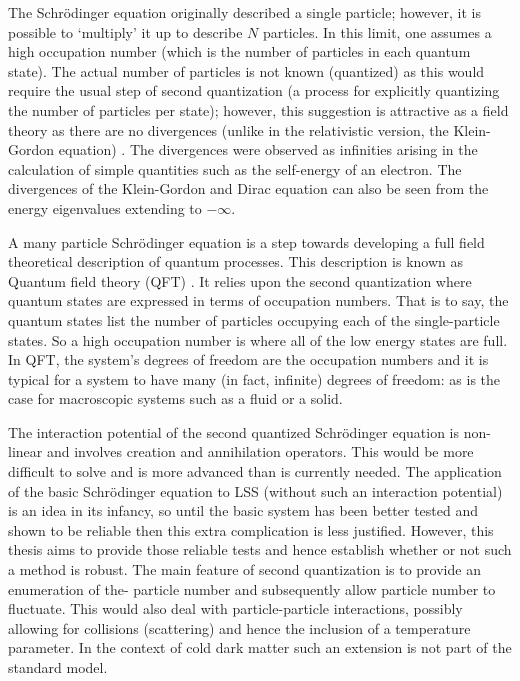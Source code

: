 The Schr\"odinger equation originally described a single particle; however, it is possible to `multiply' it up to describe $N$ particles. In this limit, one assumes a high occupation number (which is the number of particles in each quantum state). The actual number of particles is not known (quantized) as this would require the usual step of second quantization (a process for explicitly quantizing the number of particles per state); however, this suggestion is attractive as a field theory as there are no divergences (unlike in the relativistic version, the Klein-Gordon equation) \citep{bib_val}. The divergences were observed as infinities arising in the calculation of simple quantities such as the self-energy of an electron. The divergences of the Klein-Gordon and Dirac equation can also be seen from the energy eigenvalues extending to $-\infty$.

A many particle Schr\"odinger equation is a step towards developing a full field theoretical description of quantum processes. This description is known as Quantum field theory (QFT) \citep{bib_qft}. It relies upon the second quantization where quantum states are expressed in terms of occupation numbers. That is to say, the quantum states list the number of particles occupying each of the single-particle states. So a high occupation number is where all of the low energy states are full. In QFT, the system's degrees of freedom are the occupation numbers and it is typical for a system to have many (in fact, infinite) degrees of freedom: as is the case for macroscopic systems such as a fluid or a solid.

The interaction potential of the second quantized Schr\"odinger equation is non-linear and involves creation and annihilation operators. This would be more difficult to solve and is more advanced than is currently needed. The application of the basic Schr\"odinger equation to LSS (without such an interaction potential) is an idea in its infancy, so until the basic system has been better tested and shown to be reliable then this extra complication is less justified. However, this thesis aims to provide those reliable tests and hence establish whether or not such a method is robust. The main feature of second quantization is to provide an enumeration of the- particle number and subsequently allow particle number to fluctuate. This would also deal with particle-particle interactions, possibly allowing for collisions (scattering) and hence the inclusion of a temperature parameter. In the context of cold dark matter such an extension is not part of the standard model.


